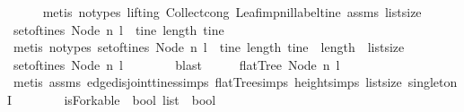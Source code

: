 \begin{isabellebody}
\ \ \ \ \isamarkupfalse%
\ {\isacharparenleft}metis\ {\isacharparenleft}no{\isacharunderscore}types{\isacharcomma}\ lifting{\isacharparenright}\ Collect{\isacharunderscore}cong\ Leaf{\isacharunderscore}imp{\isacharunderscore}nil{\isacharunderscore}label{\isacharunderscore}tine\ assms\ list{\isachardot}size{\isacharparenleft}{}{\isacharparenright}{\isacharparenright}\isanewline
\ \ \isamarkupfalse%
\ \isamarkupfalse%
\ {\isachardoublequoteopen}set{\isacharunderscore}of{\isacharunderscore}tines\ {\isacharparenleft}Node\ n\ l{\isacharparenright}\ {\isacharequal}\ {\isacharbraceleft}tine{\isachardot}\ length\ tine\ {\isacharequal}\ {}{\isacharbraceright}{\isachardoublequoteclose}\isanewline
\ \ \ \ \isamarkupfalse%
\ {\isacharparenleft}metis\ {\isacharparenleft}no{\isacharunderscore}types{\isacharparenright}\ {\isacartoucheopen}set{\isacharunderscore}of{\isacharunderscore}tines\ {\isacharparenleft}Node\ n\ l{\isacharparenright}\ {\isacharequal}\ {\isacharbraceleft}tine{\isachardot}\ length\ tine\ {\isacharequal}\ length\ {\isacharbrackleft}{\isacharbrackright}{\isacharbraceright}{\isacartoucheclose}\ list{\isachardot}size{\isacharparenleft}{}{\isacharparenright}{\isacharparenright}\isanewline
\ \ \isamarkupfalse%
\ \isamarkupfalse%
\ {\isachardoublequoteopen}set{\isacharunderscore}of{\isacharunderscore}tines\ {\isacharparenleft}Node\ n\ l{\isacharparenright}\ {\isacharequal}\ {\isacharbraceleft}{\isacharbrackleft}{\isacharbrackright}{\isacharbraceright}{\isachardoublequoteclose}\isanewline
\ \ \ \ \isamarkupfalse%
\ blast\isanewline
\ \ \isamarkupfalse%
\ \isamarkupfalse%
\ {\isachardoublequoteopen}flatTree\ {\isacharparenleft}Node\ n\ l{\isacharparenright}{\isachardoublequoteclose}\isanewline
\ \ \ \ \isamarkupfalse%
\ {\isacharparenleft}metis\ assms\ edge{\isacharunderscore}disjoint{\isacharunderscore}tines{\isachardot}simps{\isacharparenleft}{}{\isacharparenright}\ flatTree{\isachardot}simps\ height{\isachardot}simps{\isacharparenleft}{}{\isacharparenright}\ list{\isachardot}size{\isacharparenleft}{}{\isacharparenright}\ singletonI{\isacharparenright}\isanewline
{}\isamarkupfalse%
%
\endisatagproof
{\isafoldproof}%
%
\isadelimproof
\ \ \ \ \ \ \isanewline
%
\endisadelimproof
\isanewline
{}\isamarkupfalse%
\ isForkable\ {\isacharcolon}{\isacharcolon}\ {\isachardoublequoteopen}bool\ list\ {\isasymRightarrow}\ bool{\isachardoublequoteclose}\ \isanewline

\end{isabellebody}
